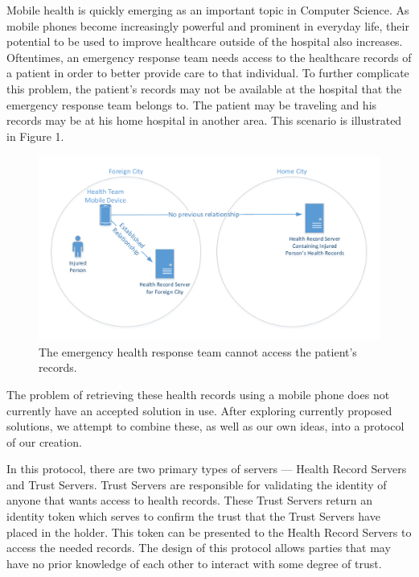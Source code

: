 Mobile health is quickly emerging as an important topic in Computer Science. As mobile phones become increasingly powerful and prominent in everyday life, their potential to be used to improve healthcare outside of the hospital also increases. Oftentimes, an emergency response team needs access to the healthcare records of a patient in order to better provide care to that individual. To further complicate this problem, the patient's records may not be available at the hospital that the emergency response team belongs to. The patient may be traveling and his records may be at his home hospital in another area. This scenario is illustrated in Figure 1.

\begin{figure}[h]
\begin{center}
\includegraphics[scale=.75]{Drawing1.pdf}
\caption{The emergency health response team cannot access the patient's records.}
\end{center}
\end{figure}

The problem of retrieving these health records using a mobile phone does not currently have an accepted solution in use. After exploring currently proposed solutions, we attempt to combine these, as well as our own ideas, into a protocol of our creation.

In this protocol, there are two primary types of servers --- Health Record Servers and Trust Servers. Trust Servers are responsible for validating the identity of anyone that wants access to health records. These Trust Servers return an identity token which serves to confirm the trust that the Trust Servers have placed in the holder. This token can be presented to the Health Record Servers to access the needed records. The design of this protocol allows parties that may have no prior knowledge of each other to interact with some degree of trust.

